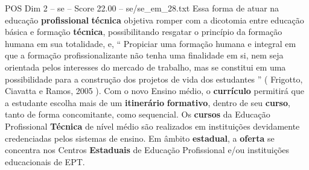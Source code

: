 \begin{textsample}{POS Dim 2 – se – Score 22.00 – se/se\_em\_28.txt}
Essa forma de atuar na educação \textbf{profissional} \textbf{técnica} objetiva romper com a dicotomia entre educação básica e formação \textbf{técnica}, possibilitando resgatar o princípio da formação humana em sua totalidade, e, “ Propiciar uma formação humana e integral em que a formação profissionalizante não tenha uma finalidade em si, nem seja orientada pelos interesses do mercado de trabalho, mas se constitui em uma possibilidade para a construção dos projetos de vida dos estudantes ” ( Frigotto, Ciavatta e Ramos, 2005 ).
Com o novo Ensino médio, o \textbf{currículo} permitirá que a estudante escolha mais de um \textbf{itinerário} \textbf{formativo}, dentro de seu \textbf{curso}, tanto de forma concomitante, como sequencial.
Os \textbf{cursos} da Educação Profissional \textbf{Técnica} de nível médio são realizados em instituições devidamente credenciadas pelos sistemas de ensino.
Em âmbito \textbf{estadual}, a \textbf{oferta} se concentra nos Centros \textbf{Estaduais} de Educação Profissional e/ou instituições educacionais de EPT.

\end{textsample}
